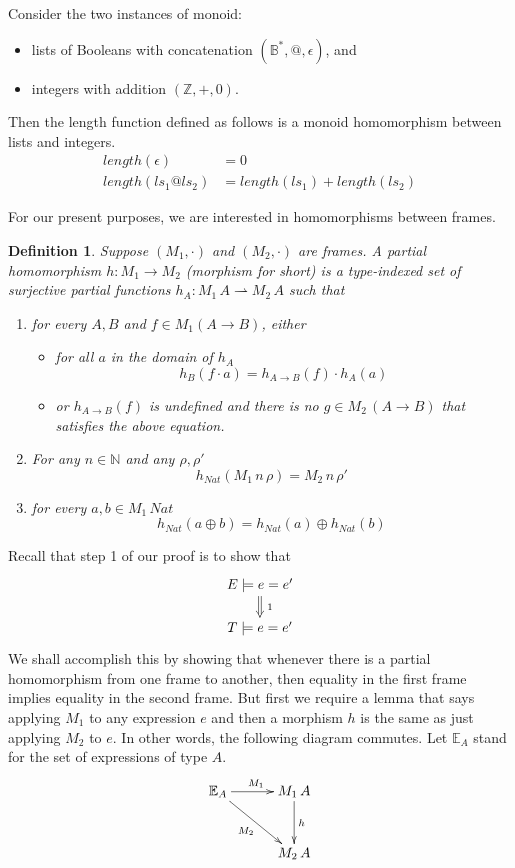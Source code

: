\documentclass{tufte-handout}
\newcommand{\NATTY}[0]{\mathit{Nat}}
\newtheorem{definition}{Definition}%
\begin{document}
Consider the two instances of monoid:
\begin{itemize}
  \item lists of Booleans with concatenation $(\mathbb{B}^{*}, @,
    \epsilon)$, and
  \item integers with addition $(\mathbb{Z}, +, 0)$.
\end{itemize}
Then the length function defined as follows is a monoid homomorphism
between lists and integers.
\begin{align*}
  \mathit{length}(\epsilon) &= 0 \\
  \mathit{length}(ls_1 @ ls_2) &= \mathit{length}(ls_1) + \mathit{length}(ls_2)
\end{align*}

For our present purposes, we are interested in homomorphisms between
frames.

\begin{definition}
  Suppose $(M_1,\cdot)$ and $(M_2,\cdot)$ are frames.  A \emph{partial
    homomorphism} $h : M_1 \to M_2$ (morphism for short) is a
  type-indexed set of surjective partial functions $h_A : M_1\,A
  \rightharpoonup M_2\,A$ such that
  \begin{enumerate}
  \item for every $A,B$ and $f \in M_1(A \to B)$,
    either
    \begin{itemize}
    \item for all $a$ in the domain of $h_A$
      \[
      h_B( f \cdot a ) = h_{A\to B}(f) \cdot h_A(a)
      \]
      
    \item or $h_{A\to B}(f)$ is undefined and there is no $g \in
      M_2\,(A\to B)$ that satisfies the above equation.
    \end{itemize}
  \item For any $n \in \mathbb{N}$ and any $\rho,\rho'$
    \[
      h_{\NATTY}(M_1\,n\,\rho) = M_2\,n\,\rho'
    \]
  \item for every $a,b \in M_1\,\NATTY$
    \[
    h_{\NATTY}(a \oplus b) = h_{\NATTY}(a) \oplus h_{\NATTY}(b)
    \]
  \end{enumerate}
\end{definition}

Recall that step 1 of our proof is to show that
\[
\xymatrix@=15pt{
  E \models e = e' \ar@{=>}[d]^{\;1} \\
  T \models e = e'
}
\]
We shall accomplish this by showing that whenever there is a partial
homomorphism from one frame to another, then equality in the first
frame implies equality in the second frame.  But first we require a
lemma that says applying $M_1$ to any expression $e$ and then a
morphism $h$ is the same as just applying $M_2$ to $e$. In other
words, the following diagram commutes. Let $\mathbb{E}_A$ stand for
the set of expressions of type $A$.
\[
\xymatrix@=30pt{
  \mathbb{E}_A \ar[r]^{M_1}\ar[dr]_{M_2} & M_1\,A \ar[d]^{h}\\
   & M_2\,A
}
\]
\end{document}

